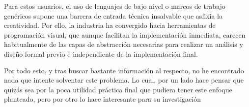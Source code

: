 Para estos usuarios, el uso de lenguajes de bajo nivel o marcos de trabajo genéricos supone una barrera de entrada técnica insalvable que asfixia la creatividad. Por ello, la industria ha convergido hacia herramientas de programación visual, que aunque facilitan la implementación inmediata, carecen habitualmente de las capas de abstracción necesarias para realizar un análisis y diseño formal previo e independiente de la implementación final. 

Por todo esto, y tras buscar bastante información al respecto, no he encontrado nada que intente solventar este problema. Lo cual, por un lado hace pensar que quizás sea por la poca utilidad práctica final que pudiera tener este enfoque planteado, pero por otro lo hace interesante para su investigación


